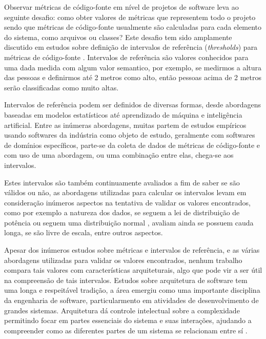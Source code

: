 Observar métricas de código-fonte em nível de projetos de software leva
ao seguinte desafio: como obter valores de métricas que representem todo o projeto sendo
que métricas de código-fonte usualmente são calculadas para cada elemento do sistema, como arquivos ou classes?
Este desafio tem sido amplamente discutido em estudos sobre definição de
intervalos de referência ({\it thresholds}) para métricas de
código-fonte \cite{Shatnawi2010, Kaur2013, Herbold2011}. Intervalos de
referência são valores conhecidos para uma dada medida
\cite[Chapter~2.1]{Lanza2007} com algum valor semantico, por exemplo, se
medirmos a altura das pessoas e definirmos até 2 metros como alto, então
pessoas acima de 2 metros serão classificadas como muito altas.


Intervalos de referência podem ser definidos de diversas formas, desde
abordagens baseadas em modelos estatísticos \cite{Shatnawi2010, Kaur2013}
até aprendizado de máquina \cite{Herbold2011} e inteligência artificial.
Entre as inúmeras abordagens, muitas partem de estudos empíricos
usando softwares da indústria como objeto de estudo, geralmente com
softwares de domínios específicos, parte-se da coleta de dados de
métricas de código-fonte e com uso de uma abordagem, ou uma combinação entre
elas, chega-se aos intervalos.

Estes intervalos são também continuamente avaliados a fim de saber se são
válidos ou não, as abordagens utilizadas para calcular os intervalos levam em
consideração inúmeros aspectos na tentativa de validar os valores encontrados,
como por exemplo a natureza dos dados, se seguem a lei de distribuição de
potência
\cite{Wheeldon2003,Potanin2005,Concas2007,Ferreira2009,Yao2009,Clauset2009} ou
seguem uma distribuição normal
\cite{Baxter2006,Lanza2007,Herraiz2011,Herraiz2012}, avaliam ainda se possuem
cauda longa, se são livre de escala, entre outros aspectos.

Apesar dos inúmeros estudos sobre métricas e intervalos de referência, e as
várias abordagens utilizadas para validar os valores encontrados, nenhum trabalho
compara tais valores com características arquiteturais,
algo que pode vir a ser útil na compreensão de tais intervalos.
Estudos sobre arquitetura de software tem uma longa e respeitável tradição, a
área emergiu como uma importante disciplina da engenharia de software,
particularmento em atividades de desenvolvimento de grandes sistemas.
Arquitetura dá controle intelectual sobre a complexidade permitindo focar em
partes essenciais do sistema e suas interações, ajudando a compreender como as
diferentes partes de um sistema se relacionam entre sí \cite{Clements2002Book}.

